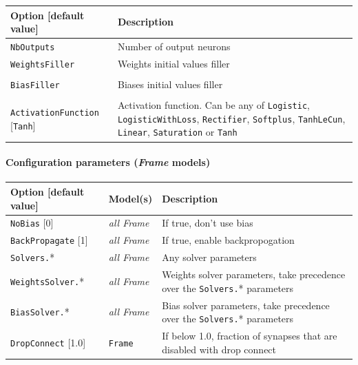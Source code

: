 \documentclass[a4paper,11pt,oneside]{article}
\begin{document}
\begin{center}
 \begin{longtable}{| p{5cm} | p{10cm} | }
 \hline
 Option [default value] & Description\\
 \hline\hline
  \cellcolor{requiredcolor}\lstinline!NbOutputs! & Number of output neurons \\
  \lstinline!WeightsFiller! & Weights initial values filler \\
   & \\
  \lstinline!BiasFiller! & Biases initial values filler \\
   & \\
  \lstinline!ActivationFunction! [\lstinline!Tanh!] & Activation function.
  Can be any of \lstinline!Logistic!,  \lstinline!LogisticWithLoss!,
  \lstinline!Rectifier!, \lstinline!Softplus!, \lstinline!TanhLeCun!,
  \lstinline!Linear!, \lstinline!Saturation! or \lstinline!Tanh! \\
 \hline
\end{longtable}
\end{center}

\paragraph{Configuration parameters (\emph{Frame} models)}

\begin{center}
 \begin{longtable}{| p{4cm} | p{3cm} | p{9cm} | }
 \hline
 Option [default value] & Model(s) & Description\\
 \hline\hline
  \lstinline!NoBias! [0] & \emph{all Frame} & If true, don't use bias \\
  \lstinline!BackPropagate! [1] & \emph{all Frame} & If true, enable
  backpropogation \\
  \lstinline!Solvers.!* & \emph{all Frame} & Any solver parameters \\
  \lstinline!WeightsSolver.!* & \emph{all Frame} & Weights solver parameters,
  take precedence over the \lstinline!Solvers.!* parameters \\
  \lstinline!BiasSolver.!* & \emph{all Frame} & Bias solver parameters,
  take precedence over the \lstinline!Solvers.!* parameters \\
  \lstinline!DropConnect! [1.0] & \lstinline!Frame! & If below 1.0, fraction of
  synapses that are disabled with drop connect \\
 \hline
\end{longtable}
\end{center}
\end{document}
